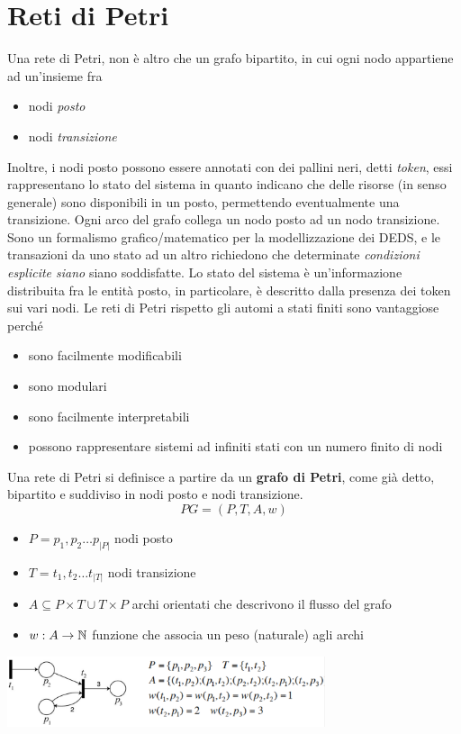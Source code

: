 \documentclass[10pt, letterpaper]{report}
\begin{document}
\section{Reti di Petri}
Una rete di Petri, non è altro che un grafo bipartito, in cui ogni nodo 
appartiene ad un'insieme fra \begin{itemize}
    \item nodi \textit{posto}
    \item nodi \textit{transizione}
\end{itemize}
Inoltre, i nodi posto possono essere annotati con dei pallini neri, detti \textit{token}, essi rappresentano 
lo stato del sistema in quanto indicano che delle risorse (in senso generale) sono disponibili in un posto, 
permettendo eventualmente una transizione. Ogni arco del grafo collega un nodo posto ad un nodo transizione.\acc 
Sono un formalismo grafico/matematico per la modellizzazione dei DEDS, e le transazioni da uno stato ad un altro richiedono che determinate \textit{condizioni esplicite siano} siano soddisfatte. Lo stato del sistema è un'informazione distribuita fra le entità posto, in particolare, è descritto dalla presenza dei token sui vari nodi.\acc 
Le reti di Petri rispetto gli automi a stati finiti sono vantaggiose perché\begin{itemize}
    \item sono facilmente modificabili 
    \item sono modulari 
    \item sono facilmente interpretabili 
    \item possono rappresentare sistemi ad infiniti stati con un numero finito di nodi
\end{itemize}
Una rete di Petri si definisce a partire da un \textbf{grafo di Petri}, come già detto, bipartito e suddiviso in nodi posto e nodi transizione. $$ PG=(P,T,A,w)$$
\begin{itemize}
    \item $P={p_1,p_2\dots p_{|P|}}$ nodi posto
    \item $T={t_1,t_2\dots t_{|T|}}$ nodi transizione 
    \item $A\subseteq P\times T \cup T \times P$ archi orientati che descrivono il flusso del grafo 
    \item $w:A\rightarrow {\mathbb N}$ funzione che associa un peso (naturale) agli archi
\end{itemize}\begin{center}
    \includegraphics[width=0.7\textwidth]{images/petri.png}
\end{center}
\end{document}
